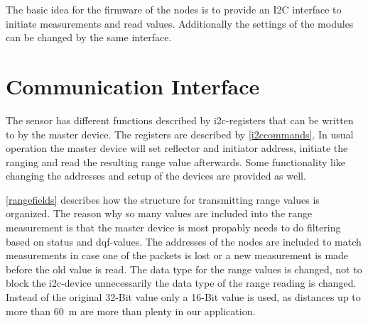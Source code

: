 
The basic idea for the firmware of the nodes is to provide an I2C interface to initiate measurements and read values.
Additionally the settings of the modules can be changed by the same interface.


\section{Communication Interface}



The sensor has different functions described by i2c-registers that can be written to by the master device.
The registers are described by \autoref{i2ccommands}.
In usual operation the master device will set reflector and initiator address, initiate the ranging and read the resulting range value afterwards.
Some functionality like changing the addresses and setup of the devices are provided as well.

\autoref{rangefields} describes how the structure for transmitting range values is organized.
The reason why so many values are included into the range measurement is that the master device is most propably needs to do filtering based on status and dqf-values. The addresses of the nodes are included to match measurements in case one of the packets is lost or a new measurement is made before the old value is read.
The data type for the range values is changed, not to block the i2c-device unnecessarily the data type of the range reading is changed.
Instead of the original 32-Bit value only a 16-Bit value is used, as distances up to more than \SI{60}{\metre} are more than plenty in our application.

